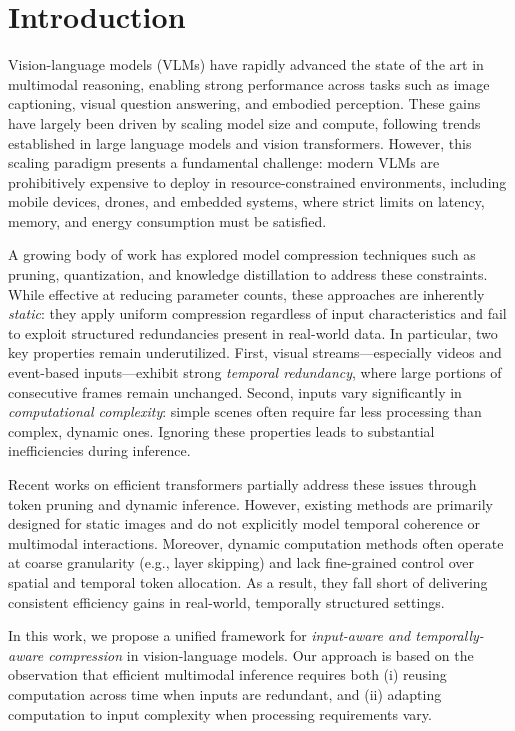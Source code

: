 \documentclass{article}
\begin{document}
\section{Introduction}
Vision-language models (VLMs) have rapidly advanced the state of the art in multimodal reasoning, enabling strong performance across tasks such as image captioning, visual question answering, and embodied perception. These gains have largely been driven by scaling model size and compute, following trends established in large language models and vision transformers. However, this scaling paradigm presents a fundamental challenge: modern VLMs are prohibitively expensive to deploy in resource-constrained environments, including mobile devices, drones, and embedded systems, where strict limits on latency, memory, and energy consumption must be satisfied.

A growing body of work has explored model compression techniques such as pruning, quantization, and knowledge distillation to address these constraints. While effective at reducing parameter counts, these approaches are inherently \emph{static}: they apply uniform compression regardless of input characteristics and fail to exploit structured redundancies present in real-world data. In particular, two key properties remain underutilized. First, visual streams—especially videos and event-based inputs—exhibit strong \emph{temporal redundancy}, where large portions of consecutive frames remain unchanged. Second, inputs vary significantly in \emph{computational complexity}: simple scenes often require far less processing than complex, dynamic ones. Ignoring these properties leads to substantial inefficiencies during inference.

Recent works on efficient transformers partially address these issues through token pruning and dynamic inference. However, existing methods are primarily designed for static images and do not explicitly model temporal coherence or multimodal interactions. Moreover, dynamic computation methods often operate at coarse granularity (e.g., layer skipping) and lack fine-grained control over spatial and temporal token allocation. As a result, they fall short of delivering consistent efficiency gains in real-world, temporally structured settings.

In this work, we propose a unified framework for \emph{input-aware and temporally-aware compression} in vision-language models. Our approach is based on the observation that efficient multimodal inference requires both (i) reusing computation across time when inputs are redundant, and (ii) adapting computation to input complexity when processing requirements vary.
\end{document}
